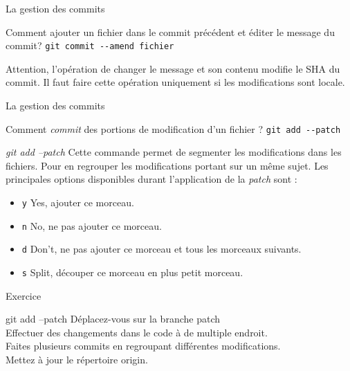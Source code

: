 \documentclass[11pt]{beamer}
\begin{document}
\begin{frame}[fragile]{La gestion des commits}
	\begin{block}{Comment ajouter un fichier dans le commit précédent et éditer le message du commit?}
		\verb|git commit --amend fichier| 
		
	\end{block}
	Attention, l'opération de changer le message et son contenu modifie le SHA du commit. Il faut faire cette opération uniquement si les modifications sont locale. 
\end{frame}

\begin{frame}[fragile]{La gestion des commits}
	\begin{block}{Comment \textit{commit} des portions de modification d'un fichier ?}
		\verb|git add --patch| 
	\end{block}
\end{frame}

\begin{frame}[fragile]{\textit{git add --patch}}
	Cette commande permet de segmenter les modifications dans les fichiers. Pour en regrouper les modifications portant sur un même sujet. Les principales options disponibles durant l'application de la \textit{patch} sont :
	\begin{itemize}
		\item \verb|y| Yes, ajouter ce morceau.
		\item \verb|n| No, ne pas ajouter ce morceau.
		\item \verb|d| Don't, ne pas ajouter ce morceau et tous les morceaux suivants.
		\item \verb|s| Split, découper ce morceau en plus petit morceau.
	\end{itemize}
\end{frame}

\begin{frame}[fragile]{Exercice}
	\begin{block}{git add --patch}
		Déplacez-vous sur la branche patch \\
		Effectuer des changements dans le code à de multiple endroit.\\
		Faites plusieurs commits en regroupant différentes modifications.\\
		Mettez à jour le répertoire origin.
	\end{block}
\end{frame}
\end{document}
